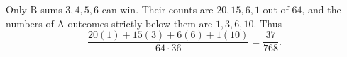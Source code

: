 Only B sums $3,4,5,6$ can win. Their counts are $20,15,6,1$ out of $64$, and the numbers of A outcomes strictly below them are $1,3,6,10$. Thus
\[\boxed{\dfrac{20(1)+15(3)+6(6)+1(10)}{64\cdot36}=\dfrac{37}{768}}.\]
